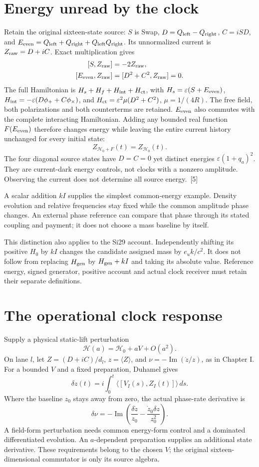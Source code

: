 \documentclass[10pt,twocolumn,letterpaper]{article}
\begin{document}
\section{Energy unread by the clock}
Retain the original sixteen-state source: $S$ is Swap, $D=Q_{\rm left}-Q_{\rm right}$, $C=iSD$, and $E_{\rm even}=Q_{\rm left}+Q_{\rm right}+Q_{\rm left}Q_{\rm right}$. Its unnormalized current is $Z_{\rm raw}=D+iC$. Exact multiplication gives
\[
\begin{aligned}
[S,Z_{\rm raw}]&=-2Z_{\rm raw},\\
[E_{\rm even},Z_{\rm raw}]&=[D^2+C^2,Z_{\rm raw}]=0.
\end{aligned}
\]
The full Hamiltonian is $H_s+H_f+H_{\rm int}+H_{\rm ct}$, with $H_s=\varepsilon(S+E_{\rm even})$, $H_{\rm int}=-\varepsilon(D\phi_++C\phi_\times)$, and $H_{\rm ct}=\varepsilon^2\mu(D^2+C^2)$, $\mu=1/(4R)$. The free field, both polarizations and both counterterms are retained. $E_{\rm even}$ also commutes with the complete interacting Hamiltonian. Adding any bounded real function $F(E_{\rm even})$ therefore changes energy while leaving the entire current history unchanged for every initial state:
\[
Z_{\mathcal H_0+F}(t)=Z_{\mathcal H_0}(t).
\]
The four diagonal source states have $D=C=0$ yet distinct energies $\varepsilon(1+q_a)^2$. They are current-dark energy controls, not clocks with a nonzero amplitude. Observing the current does not determine all source energy.~[5]

A scalar addition $kI$ supplies the simplest common-energy example. Density evolution and relative frequencies stay fixed while the common amplitude phase changes. An external phase reference can compare that phase through its stated coupling and payment; it does not choose a mass baseline by itself.

This distinction also applies to the Si29 account. Independently shifting its positive $H_0$ by $kI$ changes the candidate assigned mass by $e_uk/c^2$. It does not follow from replacing $H_{\rm gen}$ by $H_{\rm gen}+kI$ and taking its absolute value. Reference energy, signed generator, positive account and actual clock receiver must retain their separate definitions.

\section{The operational clock response}
Supply a physical static-lift perturbation
\[
\mathcal H(a)=\mathcal H_0+aV+O(a^2).
\]
On lane $l$, let $Z=(D+iC)/d_l$, $z=\langle Z\rangle$, and $\nu=-\operatorname{Im}(\dot z/z)$, as in Chapter I. For a bounded $V$ and a fixed preparation, Duhamel gives
\[
\delta z(t)=i\int_0^t\langle[V_I(s),Z_I(t)]\rangle\,ds.
\]
Where the baseline $z_0$ stays away from zero, the actual phase-rate derivative is
\[
\delta\nu=-\operatorname{Im}\left(\frac{\delta\dot z}{z_0}-\frac{\dot z_0\delta z}{z_0^2}\right).
\]
A field-form perturbation needs common energy-form control and a dominated differentiated evolution. An $a$-dependent preparation supplies an additional state derivative. These requirements belong to the chosen $V$; the original sixteen-dimensional commutator is only its source algebra.
\end{document}
